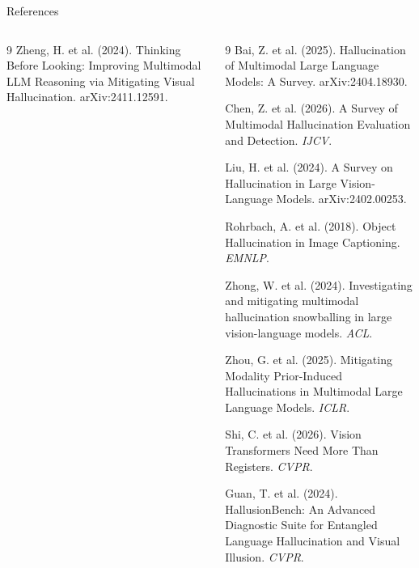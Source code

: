 \documentclass[9pt,aspectratio=169]{beamer}
\begin{document}
\begin{frame}[t]{References}
\begin{columns}[T,onlytextwidth]
\begin{thebibliography}{9}
          Zheng, H. et al. (2024).
          \newblock Thinking Before Looking: Improving Multimodal LLM Reasoning via Mitigating Visual Hallucination.
          \newblock arXiv:2411.12591.
      \end{thebibliography}

      \begin{thebibliography}{9}
        \setlength{\itemsep}{0pt}
        \setlength{\parsep}{0pt}
          Bai, Z. et al. (2025).
          \newblock Hallucination of Multimodal Large Language Models: A Survey.
          \newblock arXiv:2404.18930.

          Chen, Z. et al. (2026).
          \newblock A Survey of Multimodal Hallucination Evaluation and Detection.
          \newblock \emph{IJCV}.

          Liu, H. et al. (2024).
          \newblock A Survey on Hallucination in Large Vision-Language Models.
          \newblock arXiv:2402.00253.

          Rohrbach, A. et al. (2018).
          \newblock Object Hallucination in Image Captioning.
          \newblock \emph{EMNLP}.

          Zhong, W. et al. (2024).
          \newblock Investigating and mitigating multimodal hallucination snowballing in large vision-language models.
          \newblock \emph{ACL}.

          Zhou, G. et al. (2025).
          \newblock Mitigating Modality Prior-Induced Hallucinations in Multimodal Large Language Models.
          \newblock \emph{ICLR}.

          Shi, C. et al. (2026).
          \newblock Vision Transformers Need More Than Registers.
          \newblock \emph{CVPR}.

          Guan, T. et al. (2024).
          \newblock HallusionBench: An Advanced Diagnostic Suite for Entangled Language Hallucination and Visual Illusion.
          \newblock \emph{CVPR}.
      \end{thebibliography}
  \end{columns}
\end{frame}

\end{document}
